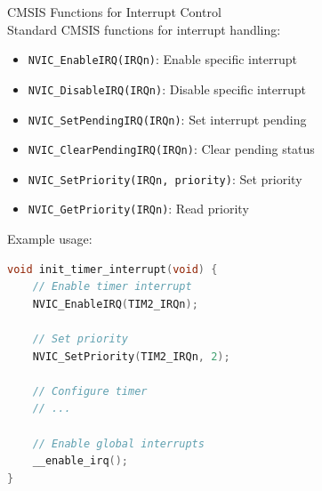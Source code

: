 \begin{KR}{CMSIS Functions for Interrupt Control}\\
Standard CMSIS functions for interrupt handling:
\begin{itemize}
  \item \texttt{NVIC\_EnableIRQ(IRQn)}: Enable specific interrupt
  \item \texttt{NVIC\_DisableIRQ(IRQn)}: Disable specific interrupt
  \item \texttt{NVIC\_SetPendingIRQ(IRQn)}: Set interrupt pending
  \item \texttt{NVIC\_ClearPendingIRQ(IRQn)}: Clear pending status
  \item \texttt{NVIC\_SetPriority(IRQn, priority)}: Set priority
  \item \texttt{NVIC\_GetPriority(IRQn)}: Read priority
\end{itemize}

Example usage:
\begin{lstlisting}[language=C, style=base]
void init_timer_interrupt(void) {
    // Enable timer interrupt
    NVIC_EnableIRQ(TIM2_IRQn);
    
    // Set priority
    NVIC_SetPriority(TIM2_IRQn, 2);
    
    // Configure timer
    // ...
    
    // Enable global interrupts
    __enable_irq();
}
\end{lstlisting}
\end{KR}